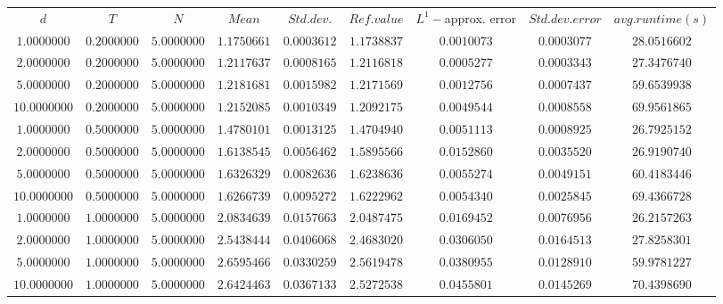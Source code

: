 \begin{tabular}{ccccccccc}
$d$ & $T$ & $N$ & $Mean$ & $Std. dev.$ & $Ref. value$ & $L^1-$approx. error & $Std. dev. error$ & $avg. runtime (s)$\\
$1.0000000$ & $0.2000000$ & $5.0000000$ & $1.1750661$ & $0.0003612$ & $1.1738837$ & $0.0010073$ & $0.0003077$ & $28.0516602$\\
$2.0000000$ & $0.2000000$ & $5.0000000$ & $1.2117637$ & $0.0008165$ & $1.2116818$ & $0.0005277$ & $0.0003343$ & $27.3476740$\\
$5.0000000$ & $0.2000000$ & $5.0000000$ & $1.2181681$ & $0.0015982$ & $1.2171569$ & $0.0012756$ & $0.0007437$ & $59.6539938$\\
$10.0000000$ & $0.2000000$ & $5.0000000$ & $1.2152085$ & $0.0010349$ & $1.2092175$ & $0.0049544$ & $0.0008558$ & $69.9561865$\\
$1.0000000$ & $0.5000000$ & $5.0000000$ & $1.4780101$ & $0.0013125$ & $1.4704940$ & $0.0051113$ & $0.0008925$ & $26.7925152$\\
$2.0000000$ & $0.5000000$ & $5.0000000$ & $1.6138545$ & $0.0056462$ & $1.5895566$ & $0.0152860$ & $0.0035520$ & $26.9190740$\\
$5.0000000$ & $0.5000000$ & $5.0000000$ & $1.6326329$ & $0.0082636$ & $1.6238636$ & $0.0055274$ & $0.0049151$ & $60.4183446$\\
$10.0000000$ & $0.5000000$ & $5.0000000$ & $1.6266739$ & $0.0095272$ & $1.6222962$ & $0.0054340$ & $0.0025845$ & $69.4366728$\\
$1.0000000$ & $1.0000000$ & $5.0000000$ & $2.0834639$ & $0.0157663$ & $2.0487475$ & $0.0169452$ & $0.0076956$ & $26.2157263$\\
$2.0000000$ & $1.0000000$ & $5.0000000$ & $2.5438444$ & $0.0406068$ & $2.4683020$ & $0.0306050$ & $0.0164513$ & $27.8258301$\\
$5.0000000$ & $1.0000000$ & $5.0000000$ & $2.6595466$ & $0.0330259$ & $2.5619478$ & $0.0380955$ & $0.0128910$ & $59.9781227$\\
$10.0000000$ & $1.0000000$ & $5.0000000$ & $2.6424463$ & $0.0367133$ & $2.5272538$ & $0.0455801$ & $0.0145269$ & $70.4398690$\\
\end{tabular}
